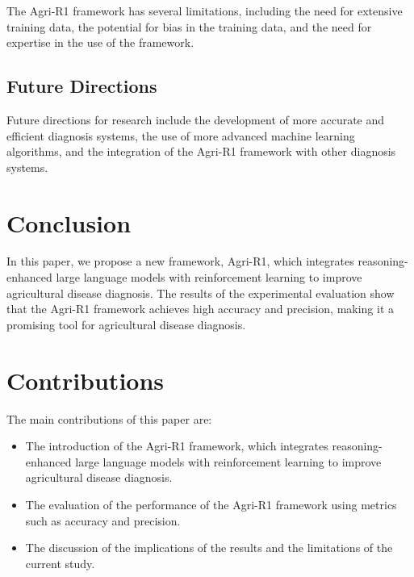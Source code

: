 \documentclass{article}
\begin{document}
The Agri-R1 framework has several limitations, including the need for extensive training data, the potential for bias in the training data, and the need for expertise in the use of the framework.

\subsection{Future Directions}

Future directions for research include the development of more accurate and efficient diagnosis systems, the use of more advanced machine learning algorithms, and the integration of the Agri-R1 framework with other diagnosis systems.

\section{Conclusion}

In this paper, we propose a new framework, Agri-R1, which integrates reasoning-enhanced large language models with reinforcement learning to improve agricultural disease diagnosis. The results of the experimental evaluation show that the Agri-R1 framework achieves high accuracy and precision, making it a promising tool for agricultural disease diagnosis.

\section{Contributions}

The main contributions of this paper are:

\begin{itemize}
    \item The introduction of the Agri-R1 framework, which integrates reasoning-enhanced large language models with reinforcement learning to improve agricultural disease diagnosis.
    \item The evaluation of the performance of the Agri-R1 framework using metrics such as accuracy and precision.
    \item The discussion of the implications of the results and the limitations of the current study.
\end{itemize}
\end{document}
